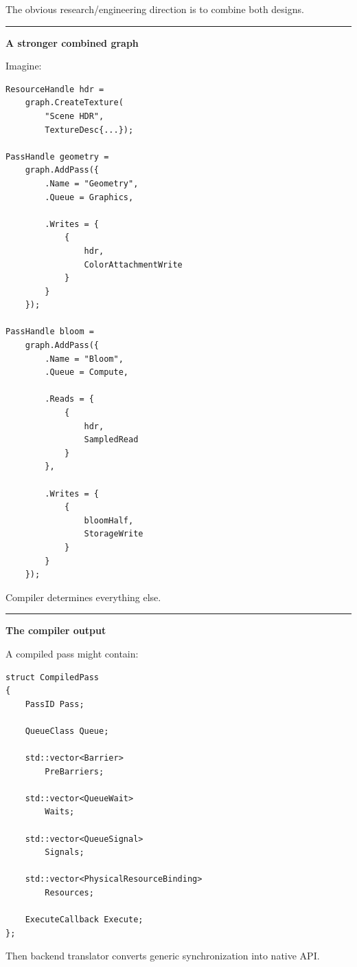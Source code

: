 The obvious research/engineering direction is to combine both designs.

\begin{center}\rule{0.5\linewidth}{0.5pt}\end{center}

\textbf{A stronger combined graph}

Imagine:

\begin{verbatim}
ResourceHandle hdr =
    graph.CreateTexture(
        "Scene HDR",
        TextureDesc{...});

PassHandle geometry =
    graph.AddPass({
        .Name = "Geometry",
        .Queue = Graphics,

        .Writes = {
            {
                hdr,
                ColorAttachmentWrite
            }
        }
    });

PassHandle bloom =
    graph.AddPass({
        .Name = "Bloom",
        .Queue = Compute,

        .Reads = {
            {
                hdr,
                SampledRead
            }
        },

        .Writes = {
            {
                bloomHalf,
                StorageWrite
            }
        }
    });
\end{verbatim}

Compiler determines everything else.

\begin{center}\rule{0.5\linewidth}{0.5pt}\end{center}

\textbf{The compiler output}

A compiled pass might contain:

\begin{verbatim}
struct CompiledPass
{
    PassID Pass;

    QueueClass Queue;

    std::vector<Barrier>
        PreBarriers;

    std::vector<QueueWait>
        Waits;

    std::vector<QueueSignal>
        Signals;

    std::vector<PhysicalResourceBinding>
        Resources;

    ExecuteCallback Execute;
};
\end{verbatim}

Then backend translator converts generic synchronization into native API.

